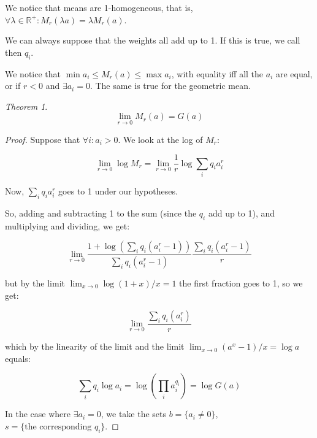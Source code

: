 \documentclass[12pt,a4paper]{report}
\numberwithin{equation}{section}
\theoremstyle{definition}
\theoremstyle{remark}
\newtheorem{theorem}{Theorem}[section]
\begin{document}
We notice that means are 1-homogeneous, that is, $\forall \lambda \in \mathbb {R}^+: M_r (\lambda a) = \lambda M_r (a)$.

We can always suppose that the weights all add up to 1. If this is true, we call then $q_i$.

We notice that $\min a_i \leq M_r (a) \leq \max a_i$, with equality iff all the $a_i$ are equal, or if $r<0$ and $\exists a_i = 0$. The same is true for the geometric mean.

\begin{theorem}
\begin{equation}
\lim_{r \rightarrow 0 } M_r (a) = G (a)
\end{equation}
\end{theorem}

\begin{proof}

Suppose that $\forall i: a_i > 0$. We look at the log of $M_r$:

\begin{equation}
\lim_{r\rightarrow 0} \log M_r = \lim_{r\rightarrow 0 } \frac{1}{r} \log \sum _i q_i a_i ^r
\end{equation}

Now, $\sum_i q_i a_i^r$ goes to 1 under our hypotheses.

So, adding and subtracting 1 to the sum (since the $q_i$ add up to 1), and multiplying and dividing, we get:

\begin{equation}
\lim_{r\rightarrow 0} \frac{1+ \log\left(\displaystyle\sum_i q_i (a_i^r -1 ) \right)}{\displaystyle\sum_i q_i (a_i^r -1)}\frac{\displaystyle\sum_i q_i ( a_i^r -1 )}{r}
\end{equation}

but by the limit $\lim_{x\rightarrow 0} \log (1+x) /x =1$ the first fraction goes to 1, so we get:

\begin{equation}
\lim_{r\rightarrow 0} \frac{\sum_i q_i (a_i^r)}{r}
\end{equation}

which by the linearity of the limit and the limit $\lim_{x\rightarrow 0} (a^x -1)/x = \log a$ equals:

\begin{equation}
\sum_i q_i \log a_i = \log \left(\prod_i a_i ^{q_i} \right) = \log G (a)
\end{equation}

In the case where $\exists a_i = 0$, we take the sets $b = \lbrace a_i \neq 0 \rbrace$, $s = \lbrace \text{the corresponding } q_i \rbrace$.


\end{proof}
\end{document}

